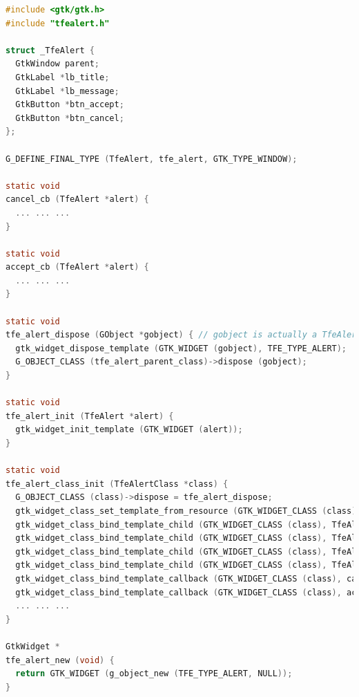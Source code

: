 \begin{lstlisting}[language=C]
#include <gtk/gtk.h>
#include "tfealert.h"

struct _TfeAlert {
  GtkWindow parent;
  GtkLabel *lb_title;
  GtkLabel *lb_message;
  GtkButton *btn_accept;
  GtkButton *btn_cancel;
};

G_DEFINE_FINAL_TYPE (TfeAlert, tfe_alert, GTK_TYPE_WINDOW);

static void
cancel_cb (TfeAlert *alert) {
  ... ... ...
}

static void
accept_cb (TfeAlert *alert) {
  ... ... ...
}

static void
tfe_alert_dispose (GObject *gobject) { // gobject is actually a TfeAlert instance.
  gtk_widget_dispose_template (GTK_WIDGET (gobject), TFE_TYPE_ALERT);
  G_OBJECT_CLASS (tfe_alert_parent_class)->dispose (gobject);
}

static void
tfe_alert_init (TfeAlert *alert) {
  gtk_widget_init_template (GTK_WIDGET (alert));
}

static void
tfe_alert_class_init (TfeAlertClass *class) {
  G_OBJECT_CLASS (class)->dispose = tfe_alert_dispose;
  gtk_widget_class_set_template_from_resource (GTK_WIDGET_CLASS (class), "/com/github/ToshioCP/tfe/tfealert.ui");
  gtk_widget_class_bind_template_child (GTK_WIDGET_CLASS (class), TfeAlert, lb_title);
  gtk_widget_class_bind_template_child (GTK_WIDGET_CLASS (class), TfeAlert, lb_message);
  gtk_widget_class_bind_template_child (GTK_WIDGET_CLASS (class), TfeAlert, btn_accept);
  gtk_widget_class_bind_template_child (GTK_WIDGET_CLASS (class), TfeAlert, btn_cancel);
  gtk_widget_class_bind_template_callback (GTK_WIDGET_CLASS (class), cancel_cb);
  gtk_widget_class_bind_template_callback (GTK_WIDGET_CLASS (class), accept_cb);
  ... ... ...
}

GtkWidget *
tfe_alert_new (void) {
  return GTK_WIDGET (g_object_new (TFE_TYPE_ALERT, NULL));
}
\end{lstlisting}

